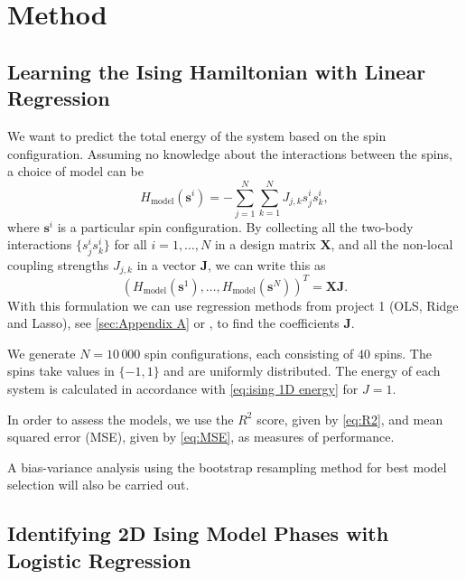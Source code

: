 \section{Method}\label{sec:Method}

\subsection{Learning the Ising Hamiltonian with Linear Regression}\label{sec:method linreg}
We want to predict the total energy of the system based on the spin configuration. Assuming no knowledge about the interactions between the spins, a choice of model can be
\begin{equation}\label{eq:general}
    H_{\text{model}}(\mathbf{s}^i) = - \sum_{j=1}^N\sum_{k=1}^N J_{j,k}s_j^is_k^i,
\end{equation}
where $\mathbf{s}^i$ is a particular spin configuration. By collecting all the two-body interactions $\{s_j^is_k^i\}$ for all $i=1,\ldots,N$ in a design matrix $\mathbf{X}$, and all the non-local coupling strengths $J_{j,k}$ in a vector $\mathbf{J}$, we can write this as
\begin{equation*}
    (H_{\text{model}}(\mathbf{s}^1), \ldots, H_{\text{model}}(\mathbf{s}^N))^T = \mathbf{X}\mathbf{J}.
\end{equation*}
With this formulation we can use regression methods from project 1 (OLS, Ridge and Lasso), see \autoref{sec:Appendix A} or \cite{PROJone}, to find the coefficients $\mathbf{J}$.

We generate $N = 10\,000$ spin configurations, each consisting of $40$ spins. The spins take values in $\{-1,1\}$ and are uniformly distributed. The energy of each system is calculated in accordance with \cref{eq:ising 1D energy} for $J=1$.

In order to assess the models, we use the $R^2$ score, given by \autoref{eq:R2}, and mean squared error (MSE), given by \autoref{eq:MSE}, as measures of performance. 

A bias-variance analysis using the bootstrap resampling method for best model selection will also be carried out.

\subsection{Identifying 2D Ising Model Phases with Logistic Regression}\label{sec:method logreg}

